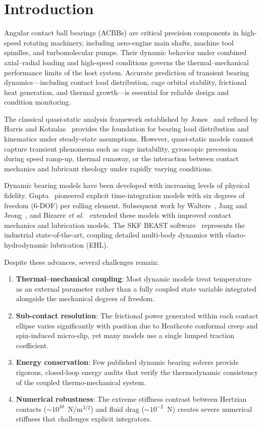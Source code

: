 \documentclass[preprint,12pt]{elsarticle}
\begin{document}
\section{Introduction}
\label{sec:intro}

Angular contact ball bearings (ACBBs) are critical precision components in high-speed rotating machinery, including aero-engine main shafts, machine tool spindles, and turbomolecular pumps. Their dynamic behavior under combined axial--radial loading and high-speed conditions governs the thermal--mechanical performance limits of the host system. Accurate prediction of transient bearing dynamics---including contact load distribution, cage orbital stability, frictional heat generation, and thermal growth---is essential for reliable design and condition monitoring.

The classical quasi-static analysis framework established by Jones~\cite{Jones1960} and refined by Harris and Kotzalas~\cite{Harris2006} provides the foundation for bearing load distribution and kinematics under steady-state assumptions. However, quasi-static models cannot capture transient phenomena such as cage instability, gyroscopic precession during speed ramp-up, thermal runaway, or the interaction between contact mechanics and lubricant rheology under rapidly varying conditions.

Dynamic bearing models have been developed with increasing levels of physical fidelity. Gupta~\cite{Gupta1984} pioneered explicit time-integration models with six degrees of freedom (6-DOF) per rolling element. Subsequent work by Walters~\cite{Walters1971}, Jang and Jeong~\cite{Jang2004}, and Bizarre \textit{et al.}~\cite{Bizarre2018} extended these models with improved contact mechanics and lubrication models. The SKF BEAST software~\cite{Stacke1999} represents the industrial state-of-the-art, coupling detailed multi-body dynamics with elasto-hydrodynamic lubrication (EHL).

Despite these advances, several challenges remain:
\begin{enumerate}
    \item \textbf{Thermal--mechanical coupling}: Most dynamic models treat temperature as an external parameter rather than a fully coupled state variable integrated alongside the mechanical degrees of freedom.
    \item \textbf{Sub-contact resolution}: The frictional power generated within each contact ellipse varies significantly with position due to Heathcote conformal creep and spin-induced micro-slip, yet many models use a single lumped traction coefficient.
    \item \textbf{Energy conservation}: Few published dynamic bearing solvers provide rigorous, closed-loop energy audits that verify the thermodynamic consistency of the coupled thermo-mechanical system.
    \item \textbf{Numerical robustness}: The extreme stiffness contrast between Hertzian contacts ($\sim 10^{10}$~N/m$^{3/2}$) and fluid drag ($\sim 10^{-2}$~N) creates severe numerical stiffness that challenges explicit integrators.
\end{enumerate}
\end{document}
